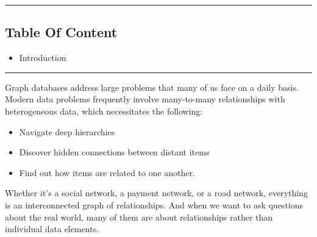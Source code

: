 \documentclass[12pt,a4paper]{article}
\begin{document}
\rule{\textwidth}{1pt}
    \begin{center}
        \section* {Table Of Content}
    \end{center}
    
  \begin{itemize}
    \item Introduction
  \end{itemize}

  \rule{\textwidth}{1pt}
  
\pagebreak

Graph databases address large problems that many of us face on a daily basis. Modern data problems frequently involve many-to-many relationships with heterogeneous data, which necessitates the following:
\begin{itemize}
    \item Navigate deep hierarchies
    \item Discover hidden connections between distant items
    \item Find out how items are related to one another.
  \end{itemize}
Whether it's a social network, a payment network, or a road network, everything is an interconnected graph of relationships. And when we want to ask questions about the real world, many of them are about relationships rather than individual data elements.
\end{document}
